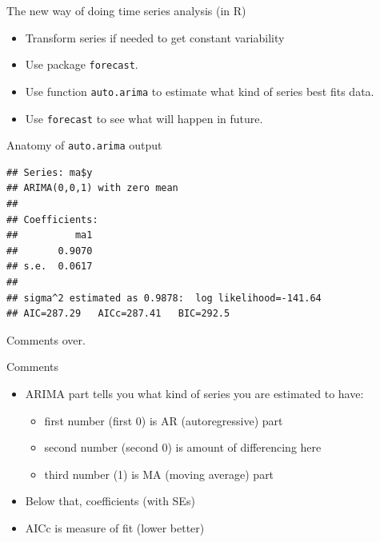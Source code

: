 \documentclass[
  ignorenonframetext,
]{beamer}
\newenvironment{Shaded}{\begin{snugshade}}{\end{snugshade}}
\newcommand{\KeywordTok}[1]{\textcolor[rgb]{0.13,0.29,0.53}{\textbf{#1}}}
\newcommand{\NormalTok}[1]{#1}
\newcommand{\OperatorTok}[1]{\textcolor[rgb]{0.81,0.36,0.00}{\textbf{#1}}}
\providecommand{\tightlist}{%
  \setlength{\itemsep}{0pt}\setlength{\parskip}{0pt}}
\begin{document}
\begin{frame}[fragile]{The new way of doing time series analysis (in R)}
\protect\hypertarget{the-new-way-of-doing-time-series-analysis-in-r}{}

\begin{itemize}
\tightlist
\item
  Transform series if needed to get constant variability
\item
  Use package \texttt{forecast}.
\item
  Use function \texttt{auto.arima} to estimate what kind of series best
  fits data.
\item
  Use \texttt{forecast} to see what will happen in future.
\end{itemize}

\end{frame}

\begin{frame}[fragile]{Anatomy of \texttt{auto.arima} output}
\protect\hypertarget{anatomy-of-auto.arima-output}{}

\begin{Shaded}
\end{Shaded}

\begin{verbatim}
## Series: ma$y 
## ARIMA(0,0,1) with zero mean 
## 
## Coefficients:
##          ma1
##       0.9070
## s.e.  0.0617
## 
## sigma^2 estimated as 0.9878:  log likelihood=-141.64
## AIC=287.29   AICc=287.41   BIC=292.5
\end{verbatim}

Comments over.

\end{frame}

\begin{frame}{Comments}
\protect\hypertarget{comments-50}{}

\begin{itemize}
\tightlist
\item
  ARIMA part tells you what kind of series you are estimated to have:

  \begin{itemize}
  \tightlist
  \item
    first number (first 0) is AR (autoregressive) part
  \item
    second number (second 0) is amount of differencing here
  \item
    third number (1) is MA (moving average) part
  \end{itemize}
\item
  Below that, coefficients (with SEs)
\item
  AICc is measure of fit (lower better)
\end{itemize}

\end{frame}
\end{document}
